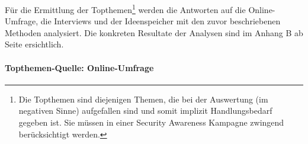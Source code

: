 \documentclass[../../main.tex]{subfiles}
\begin{document}
\begin{sloppypar}
Für die Ermittlung der Topthemen\footnote{Die Topthemen sind diejenigen Themen, die bei der Auswertung (im negativen Sinne) aufgefallen sind und somit implizit Handlungsbedarf gegeben ist. Sie müssen in einer Security Awareness Kampagne zwingend berücksichtigt werden.} werden die Antworten auf die Online-Umfrage, die Interviews und der Ideenspeicher mit den zuvor beschriebenen Methoden analysiert. Die konkreten Resultate der Analysen sind im Anhang B ab Seite \pageref{Anhang B} ersichtlich.
\end{sloppypar}

\paragraph*{Topthemen-Quelle: Online-Umfrage}\mbox{}
\end{document}

